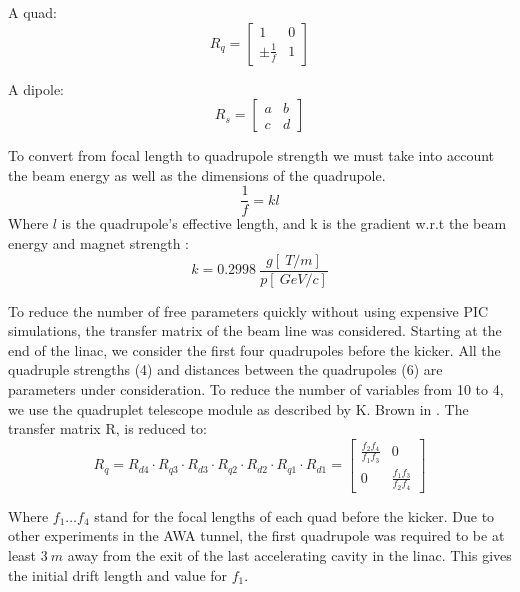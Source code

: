 A quad: 
\begin{equation}
R_q = 
\begin{bmatrix}
1 & 0 \\
\pm \frac{1}{f} & 1
\end{bmatrix}
\end{equation}

A dipole:
\begin{equation}
R_s = 
\begin{bmatrix}
a & b \\
c & d
\end{bmatrix}
\end{equation}

To convert from focal length to quadrupole strength we must take into account the 
beam energy as well as the dimensions of the quadrupole. 
\begin{equation}
	\frac{1}{f} = kl 
\end{equation}
Where $l$ is the quadrupole's effective length, and k is the gradient w.r.t 
the beam energy and magnet strength \cite{Wiedemann}:
\begin{equation}
	k = \SI{0.2998}{} \frac{g[\SI{}{T/m}]}{p [\SI{}{GeV/c}]}\label{k}
\end{equation}



 To reduce the number of free parameters quickly without using expensive PIC simulations, 
 the transfer matrix of the beam line was considered. Starting at the end of the linac, 
 we consider the first four quadrupoles before the kicker. All the quadruple strengths (4) and
 distances between the quadrupoles (6) are parameters under consideration. To reduce the number
 of variables from 10 to 4, we use the quadruplet telescope module as described by K. Brown in \cite{brown}.  The transfer matrix R, is reduced to:  
 \begin{equation}
 R_q = R_{d4} \cdot R_{q3} \cdot R_{d3} \cdot R_{q2} \cdot R_{d2} \cdot R_{q1} \cdot R_{d1} = 
 \begin{bmatrix}
 \frac{f_2 f_4}{f_1 f_3} & 0 \\
 0 & \frac{f_1 f_3}{f_2 f_4}	
 \end{bmatrix}\label{kb1}
 \end{equation}

Where $f_1 \ldots f_4$ stand for the focal lengths of each quad before the kicker. 
Due to other experiments in the AWA tunnel, 
the first quadrupole was required to be at least $\SI{3}{m}$ away from the exit of the 
last accelerating cavity in the linac. This gives the initial drift length and value
for $f_1$. 

